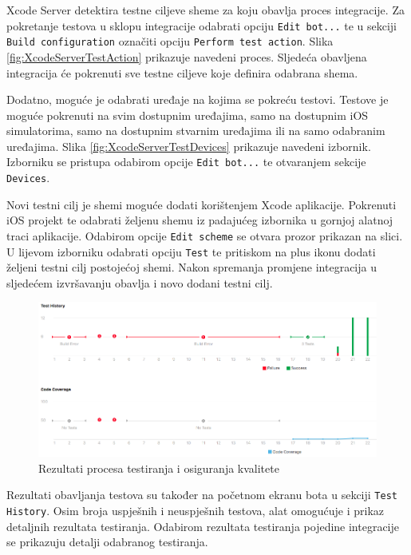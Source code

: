 \documentclass[times, utf8, diplomski, numeric]{fer}
\begin{document}
Xcode Server detektira testne ciljeve sheme za koju obavlja proces integracije. Za pokretanje testova u sklopu integracije odabrati opciju \verb|Edit bot...| te u sekciji \verb|Build configuration| označiti opciju \verb|Perform test action|. Slika \ref{fig:XcodeServerTestAction} prikazuje navedeni proces. Sljedeća obavljena integracija će pokrenuti sve testne ciljeve koje definira odabrana shema.

Dodatno, moguće je odabrati uređaje na kojima se pokreću testovi. Testove je moguće pokrenuti na svim dostupnim uređajima, samo na dostupnim iOS simulatorima, samo na dostupnim stvarnim uređajima ili na samo odabranim uređajima. Slika \ref{fig:XcodeServerTestDevices} prikazuje navedeni izbornik. Izborniku se pristupa odabirom opcije \verb|Edit bot...| te otvaranjem sekcije \verb|Devices|.

Novi testni cilj je shemi moguće dodati korištenjem Xcode aplikacije. Pokrenuti iOS projekt te odabrati željenu shemu iz padajućeg izbornika u gornjoj alatnoj traci aplikacije. Odabirom opcije \verb|Edit scheme| se otvara prozor prikazan na slici. U lijevom izborniku odabrati opciju \verb|Test| te pritiskom na plus ikonu dodati željeni testni cilj postojećoj shemi. Nakon spremanja promjene integracija u sljedećem izvršavanju obavlja i novo dodani testni cilj.

\begin{figure}[b!]
\centering
\includegraphics[scale=0.4]{XcodeServerTestResult}
\caption{Rezultati procesa testiranja i osiguranja kvalitete}
\label{fig:XcodeServerTestResult}
\end{figure}

Rezultati obavljanja testova su također na početnom ekranu bota u sekciji \verb|Test History|. Osim broja uspješnih i neuspješnih testova, alat omogućuje i prikaz detaljnih rezultata testiranja. Odabirom rezultata testiranja pojedine integracije se prikazuju detalji odabranog testiranja.
\end{document}
